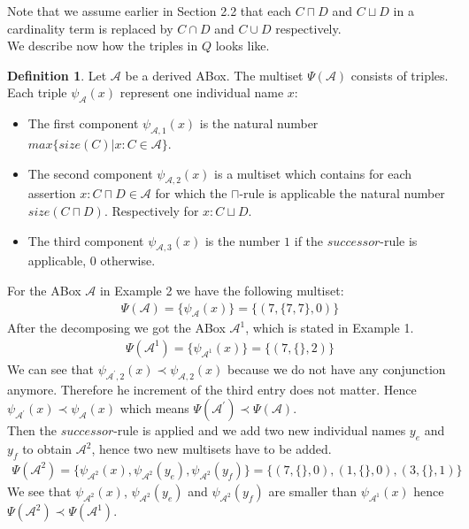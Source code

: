 \documentclass{book}
\theoremstyle{break}
\theoremstyle{definition}
\newtheorem{mydef}{Definition}
\begin{document}
Note that we assume earlier in Section 2.2 that each $C\sqcap D$ and $C\sqcup D$ in a cardinality term is replaced by $C\cap D$ and $C\cup D$ respectively.\\
We describe now how the triples in $Q$ looks like.
\begin{mydef}
Let $\mathcal{A}$ be a derived ABox. The multiset $\Psi(\mathcal{A})$ consists of triples. Each triple $\psi_\mathcal{A}(x)$ represent one individual name $x$:
\begin{itemize}
\item The first component $\psi_{\mathcal{A},1}(x)$ is the natural number $max\{size(C)|x:C\in\mathcal{A}\}$.
\item The second component $\psi_{\mathcal{A},2}(x)$ is a multiset which contains for each assertion $x:C\sqcap D\in\mathcal{A}$ for which the $\sqcap$-rule is applicable the natural number $size(C\sqcap D)$. Respectively for $x:C\sqcup D$.
\item The third component $\psi_{\mathcal{A},3}(x)$ is the number $1$ if the $successor$-rule is applicable, $0$ otherwise.
\end{itemize}
\end{mydef}
For the ABox $\mathcal{A}$ in Example 2 we have the following multiset:
\begin{align}
\Psi(\mathcal{A})=\{\psi_\mathcal{A}(x)\}=\{(7,\{7,7\},0)\}
\end{align}
After the decomposing we got the ABox $\mathcal{A}^1$, which is stated in Example 1.
\begin{align}
\Psi(\mathcal{A}^1)=\{\psi_{\mathcal{A}^1}(x)\}=\{(7,\{\},2)\}
\end{align}
We can see that $\psi_{\mathcal{A}^\prime,2}(x)\prec\psi_{\mathcal{A},2}(x)$ because we do not have any conjunction anymore. Therefore he increment of the third entry does not matter. Hence $\psi_{\mathcal{A}^\prime}(x)\prec\psi_\mathcal{A}(x)$ which means $\Psi(\mathcal{A}^\prime)\prec\Psi(\mathcal{A})$.\\
Then the $successor$-rule is applied and we add two new individual names $y_e$ and $y_f$ to obtain $\mathcal{A}^2$, hence two new multisets have to be added.
\begin{align}
\Psi(\mathcal{A}^2)=\{\psi_{\mathcal{A}^2}(x),\psi_{\mathcal{A}^2}(y_e), \psi_{\mathcal{A}^2}(y_f)\}=\{(7,\{\},0),(1,\{\},0),(3,\{\},1)\}
\end{align}
We see that $\psi_{\mathcal{A}^2}(x)$, $\psi_{\mathcal{A}^2}(y_e)$ and $\psi_{\mathcal{A}^2}(y_f)$ are smaller than $\psi_{\mathcal{A}^1}(x)$ hence $\Psi(\mathcal{A}^2)\prec \Psi(\mathcal{A}^1)$.\\
\end{document}
